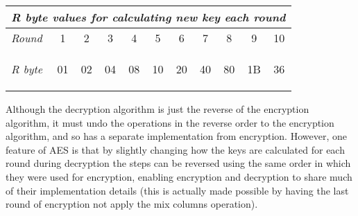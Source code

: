 \begin{figure*}[h]\begin{center}
\begin{tabular}{|l|c|c|c|c|c|c|c|c|c|c|} \hline
  \multicolumn{11}{|l|}{\textit{R byte values for calculating new key each round}}
    \\ \hline\hline
  \textit{Round} & 1 & 2 & 3 & 4 & 5 & 6 & 7 & 8 & 9 & 10 \\
  \textit{R byte} & \begin{code}01\end{code} & \begin{code}02\end{code}
    & \begin{code}04\end{code} & \begin{code}08\end{code}
    & \begin{code}10\end{code} & \begin{code}20\end{code}
    & \begin{code}40\end{code} & \begin{code}80\end{code}
    & \begin{code}1B\end{code} & \begin{code}36\end{code} \\ \hline
\end{tabular}
\end{center}\end{figure*}

Although the decryption algorithm is just the reverse of the encryption
algorithm, it must undo the operations in the reverse order to the
encryption algorithm, and so has a separate implementation
from encryption. However, one feature of AES is that by slightly changing
how the keys are calculated for each round during decryption the steps
can be reversed using the same order in which they were used for encryption,
enabling encryption and decryption to share much of their implementation
details (this is actually made possible by having the last round of
encryption not apply the mix columns operation).

